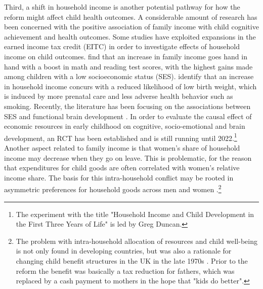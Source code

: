 \documentclass[11pt, a4paper,draft]{article} %
\begin{document}
Third, a shift in household income is another potential pathway for how the reform might affect child health outcomes. A considerable amount of research has been concerned with the positive association of family income with child cognitive achievement and health outcomes. Some studies have exploited expansions in the earned income tax credit (EITC) in order to investigate effects of household income on child outcomes. \cite{dahl2012impact} find that an increase in family income goes hand in hand with a boost in math and reading test scores, with the highest gains made among children with a low socioeconomic status (SES). \cite{hoynes2015income} identify that an increase in household income concurs with a reduced likelihood of low birth weight, which is induced by more prenatal care and less adverse health behavior such as smoking. Recently, the literature has been focusing on the associations between SES and functional brain development \citep{tomalski2013}. In order to evaluate the causal effect of economic resources in early childhood on cognitive, socio-emotional and brain development, an RCT has been established and is still running until 2022.\footnote{The experiment with the title "Household Income and Child Development in the First Three Years of Life" is led by Greg Duncan.} \newline
Another aspect related to family income is that women's share of household income may decrease when they go on leave. This is problematic, for the reason that expenditures for child goods are often correlated with women's relative income share. The basis for this intra-household conflict may be rooted in asymmetric preferences for household goods across men and women \citep{anderson2002economics}.\footnote{The problem with intra-household allocation of resources and child well-being is not only found in developing countries, but was also a rationale for changing child benefit structures in the UK in the late 1970s \citep{lundberg1996bargaining}. Prior to the reform the benefit was basically a tax reduction for fathers, which was replaced by a cash payment to mothers in the hope that "kids do better".}\newline
\end{document}

